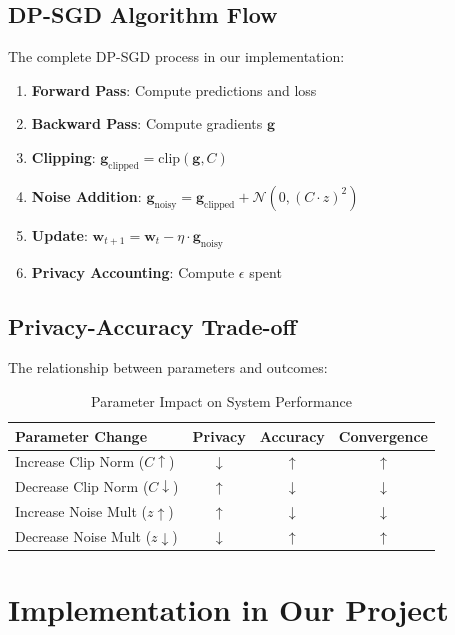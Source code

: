 \documentclass[12pt,a4paper]{article}
\begin{document}
\subsection{DP-SGD Algorithm Flow}

The complete DP-SGD process in our implementation:

\begin{enumerate}
    \item \textbf{Forward Pass}: Compute predictions and loss
    \item \textbf{Backward Pass}: Compute gradients $\mathbf{g}$
    \item \textbf{Clipping}: $\mathbf{g}_{\text{clipped}} = \text{clip}(\mathbf{g}, C)$
    \item \textbf{Noise Addition}: $\mathbf{g}_{\text{noisy}} = \mathbf{g}_{\text{clipped}} + \mathcal{N}(0, (C \cdot z)^2)$
    \item \textbf{Update}: $\mathbf{w}_{t+1} = \mathbf{w}_t - \eta \cdot \mathbf{g}_{\text{noisy}}$
    \item \textbf{Privacy Accounting}: Compute $\epsilon$ spent
\end{enumerate}

\subsection{Privacy-Accuracy Trade-off}

The relationship between parameters and outcomes:

\begin{table}[h]
\centering
\begin{tabular}{|l|c|c|c|}
\hline
\textbf{Parameter Change} & \textbf{Privacy} & \textbf{Accuracy} & \textbf{Convergence} \\
\hline
Increase Clip Norm ($C \uparrow$) & $\downarrow$ & $\uparrow$ & $\uparrow$ \\
Decrease Clip Norm ($C \downarrow$) & $\uparrow$ & $\downarrow$ & $\downarrow$ \\
Increase Noise Mult ($z \uparrow$) & $\uparrow$ & $\downarrow$ & $\downarrow$ \\
Decrease Noise Mult ($z \downarrow$) & $\downarrow$ & $\uparrow$ & $\uparrow$ \\
\hline
\end{tabular}
\caption{Parameter Impact on System Performance}
\end{table}

\section{Implementation in Our Project}
\end{document}
